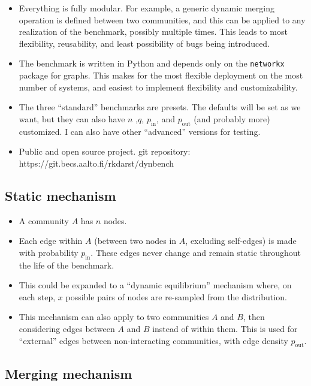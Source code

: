 \documentclass{article}
\def\pin{p_\mathrm{in}}
\def\pout{p_\mathrm{out}}
\begin{document}
\begin{itemize}
\item Everything is fully modular.  For example, a generic dynamic merging operation is
  defined between two communities, and this can be applied to any
  realization of the benchmark, possibly multiple times.  This leads
  to most flexibility, reusability, and least possibility of bugs being introduced.
\item The benchmark is written in Python and depends only on the
  \texttt{networkx} package for graphs.  This makes for the most
  flexible deployment on the most number of systems, and easiest to
  implement flexibility and customizability.
\item The three ``standard'' benchmarks are presets.  The defaults
  will be set as we want, but they can also have $n$ ,$q$, $\pin$,
  and $\pout$ (and probably more) customized.  I can also have other
  ``advanced'' versions
  for testing.
\item Public and open source project.  git repository:
  https://git.becs.aalto.fi/rkdarst/dynbench
\end{itemize}



\subsection{Static mechanism}
\begin{itemize}
\item A community $A$ has $n$ nodes.
\item Each edge within $A$ (between two nodes in $A$, excluding
  self-edges) is made with probability $\pin$.  These edges never
  change and remain static throughout the life of the benchmark.
\item This could be expanded to a ``dynamic equilibrium'' mechanism
  where, on each step, $x$ possible pairs of nodes are re-sampled from
  the distribution.
\item This mechanism can also apply to two communities $A$ and $B$,
  then considering edges between $A$ and $B$ instead of within them.
  This is used for ``external'' edges between non-interacting
  communities, with edge density $\pout$.
\end{itemize}



\subsection{Merging mechanism}
\end{document}
